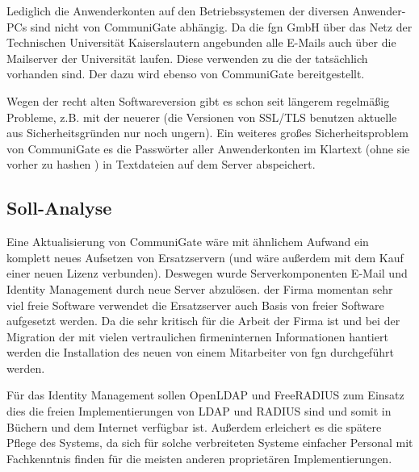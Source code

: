 \documentclass[11pt,a4paper,titlepage=firstiscover]{scrartcl} %
\begin{document}
Lediglich die Anwenderkonten auf den Betriebssystemen der diversen Anwender-PCs 
sind nicht von CommuniGate abhängig. Da die fgn GmbH über das Netz der 
Technischen Universität Kaiserslautern angebunden  alle E-Mails 
auch über die Mailserver der Universität laufen. Diese verwenden  
zu  die  der 
 tatsächlich 
vorhanden sind. Der  dazu wird ebenso von CommuniGate 
bereitgestellt. 

Wegen der recht alten Softwareversion gibt es schon seit längerem regelmäßig 
Probleme, z.B. mit der  neuerer  
(die  Versionen von SSL/TLS benutzen 
aktuelle  aus Sicherheitsgründen nur noch ungern). Ein 
weiteres großes Sicherheitsproblem von CommuniGate  es die 
Passwörter aller Anwenderkonten im Klartext (ohne sie vorher zu hashen 
) in Textdateien auf dem Server abspeichert.

\subsection{Soll-Analyse}
Eine Aktualisierung von CommuniGate wäre mit ähnlichem Aufwand   ein komplett neues Aufsetzen von Ersatzservern (und wäre außerdem mit dem Kauf einer neuen Lizenz verbunden). Deswegen 
wurde  Serverkomponenten E-Mail und Identity Management 
durch neue Server abzulösen.   der Firma momentan sehr 
viel freie Software verwendet  die Ersatzserver auch  Basis von freier Software aufgesetzt werden. Da die 
 sehr kritisch für die Arbeit der Firma ist und bei 
der Migration der  mit vielen vertraulichen firmeninternen 
Informationen hantiert werden  die Installation des neuen 
 von einem Mitarbeiter von fgn durchgeführt werden.

Für das Identity Management sollen OpenLDAP und FreeRADIUS zum Einsatz 
 dies die  freien 
Implementierungen von LDAP und RADIUS sind und somit in Büchern und dem 
Internet  verfügbar ist. Außerdem erleichert 
es die spätere Pflege des Systems, da sich für solche verbreiteten Systeme 
einfacher Personal mit Fachkenntnis finden  
für die meisten anderen proprietären Implementierungen.
\end{document}
